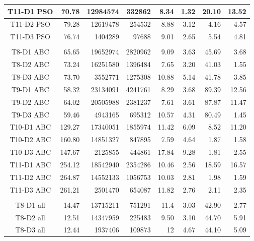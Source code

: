 \documentclass[a4paper,slovak,12pt,appendix]{article}
\begin{document}
\begin{appendices}
\begin{table}[!ht]
\begin{tabular}{|c|r|r|r|r|r|r|r|}
		T11-D1 PSO		&	70.78	&	12984574		&	332862	&	8.34	&	1.32	&	20.10	&	13.52	\\ \hline
		T11-D2 PSO		&	79.28	&	12619478		&	254532	&	8.88	&	3.12	&	4.16	&	4.57	\\ \hline
		T11-D3 PSO		&	76.74	&	1404289			&	97688		&	9.01	&	2.65	&	5.54	&	4.81	\\ \hline
		\multicolumn{8}{|c|}{}	\\ \hline

		T8-D1 ABC			&	65.65	&	19652974		&	2820962	&	9.09	&	3.63	&	45.69	&	3.68	\\ \hline
		T8-D2 ABC			&	73.24	&	16251580		&	1396484	&	7.65	&	3.20	&	41.03	&	1.55	\\ \hline
		T8-D3 ABC			&	73.70	&	3552771			&	1275308	&	10.88	&	5.14	&	41.78	&	3.85	\\ \hline

		T9-D1 ABC			&	58.32	&	23134091		&	4241761	&	8.29	&	3.68	&	89.39	&	12.56	\\ \hline
		T9-D2 ABC			&	64.02	&	20505988		&	2381237	&	7.61	&	3.61	&	87.87	&	11.47	\\ \hline
		T9-D3 ABC			&	59.46	&	4943165			&	695312	&	10.57	&	4.31	&	80.49	&	1.45	\\ \hline

		T10-D1 ABC		&	129.27	&	17340051	&	1855974	&	11.42	&	6.09	&	8.52	&	11.20	\\ \hline
		T10-D2 ABC		&	160.80	&	14851327	&	847895	&	7.59	&	4.64	&	1.87	&	1.58	\\ \hline
		T10-D3 ABC		&	147.67	&	2125855		&	444861	&	17.84	&	9.28	&	1.81	&	2.55	\\ \hline

		T11-D1 ABC		&	254.12	&	18542940	&	2354286	&	10.46	&	2.56	&	18.59	&	16.57	\\ \hline
		T11-D2 ABC		&	264.87	&	14552133	&	1056753	&	10.03	&	2.81	&	1.98	&	1.59	\\ \hline
		T11-D3 ABC		&	261.21	&	2501470		&	654087	&	11.82	&	2.76	&	2.11	&	2.35	\\ \hline
		\multicolumn{8}{|c|}{}	\\ \hline

		T8-D1 all			&	14.47	&	13715211		&	751291	&	11.4	&	3.03	&	42.90	&	2.77	\\ \hline
		T8-D2 all			&	12.51	&	14347959		&	225483	&	9.50	&	3.10	&	44.70	&	5.91	\\ \hline
		T8-D3 all			&	12.44	&	1937406			&	109873	&	12		&	4.67	&	44.10	&	5.09	\\ \hline


\end{tabular}
\end{table}
\end{appendices}
\end{document}
